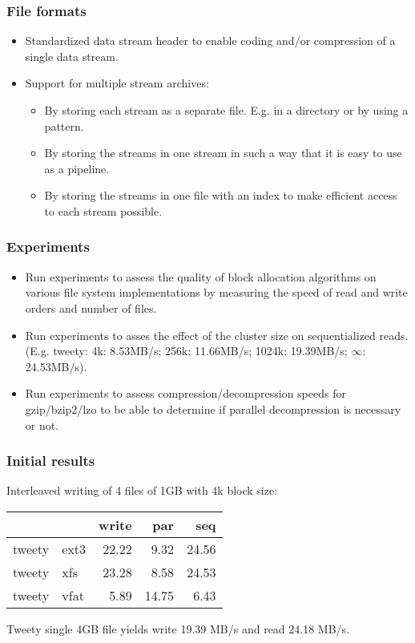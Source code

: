 \documentclass{beamer}
\begin{document}
\begin{frame}
\frametitle{File formats}
\begin{itemize}
\item Standardized data stream header to enable coding and/or compression
of a single data stream.
\item Support for multiple stream archives:
\begin{itemize}
\item By storing each stream as a separate file. E.g. in a directory or by using a pattern.
\item By storing the streams in one stream in such a way that it is easy to use as a pipeline.
\item By storing the streams in one file with an index to make efficient
 access to each stream possible.
\end{itemize}
\end{itemize}
\end{frame}

\begin{frame}
\frametitle{Experiments}
\begin{itemize}
\item Run experiments to assess the quality of block allocation algorithms on various
file system implementations by measuring the speed of read and write orders and number of files.
\item Run experiments to asses the effect of the cluster size on sequentialized reads.
(E.g. tweety: 4k: 8.53MB/s; 256k: 11.66MB/s; 1024k: 19.39MB/s; $\infty$: 24.53MB/s).
\item Run experiments to assess compression/decompression speeds for gzip/bzip2/lzo
to be able to determine if parallel decompression is necessary or not.
\end{itemize}
\end{frame}

\begin{frame}
\frametitle{Initial results}
Interleaved writing of 4 files of 1GB with 4k block size:
\begin{tabular}{llrrr}
\hline
&&write&par&seq
\\\hline
tweety & ext3 & 22.22 & 9.32 & 24.56
\\\hline
tweety & xfs & 23.28 & 8.58 & 24.53
\\\hline
tweety & vfat & 5.89 & 14.75 & 6.43
\\\hline
\end{tabular}
Tweety single 4GB file yields write 19.39 MB/s and read 24.18 MB/s.
\end{frame}
\end{document}
